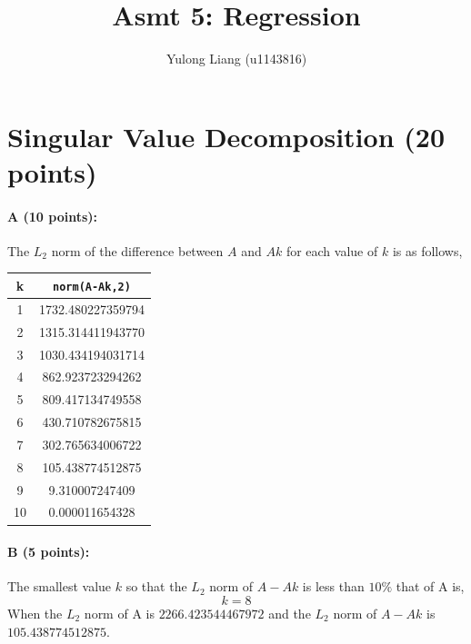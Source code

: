 \documentclass[11pt]{article}
\title{Asmt 5: Regression}
\author{Yulong Liang (u1143816)}
\begin{document}
\maketitle

\section{Singular Value Decomposition (20 points)}

\paragraph{A (10 points):}The $L_2$ norm of the difference between $A$ and $Ak$ for each value of $k$ is as follows,
\begin{table}[H]
\centering
\begin{tabular}{c|c}
k & \texttt{norm(A-Ak,2)}\\
\hline
1 & 1732.480227359794\\
2 & 1315.314411943770\\
3 & 1030.434194031714\\
4 & 862.923723294262\\
5 & 809.417134749558\\
6 & 430.710782675815\\
7 & 302.765634006722\\
8 & 105.438774512875\\
9 & 9.310007247409\\
10 & 0.000011654328\\
\end{tabular}
\end{table}

\paragraph{B (5 points):}The smallest value $k$ so that the $L_2$ norm of $A-Ak$ is less than $10\%$ that of A is,
$$k=8$$
When the $L_2$ norm of A is $2266.423544467972$ and the $L_2$ norm of $A-Ak$ is $105.438774512875$.
\end{document}
